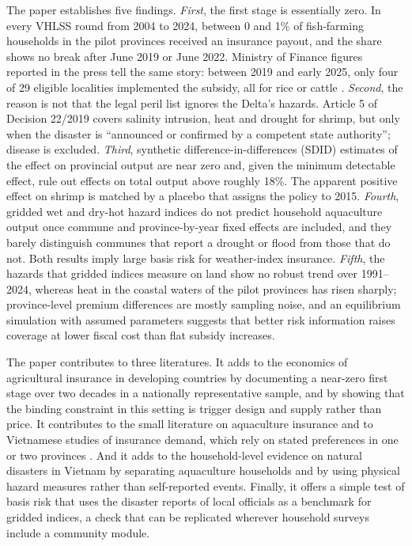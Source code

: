 \documentclass[11pt,a4paper]{article}
\begin{document}
The paper establishes five findings. \textit{First}, the first stage is essentially zero. In every VHLSS round from 2004 to 2024, between 0 and 1\% of fish-farming households in the pilot provinces received an insurance payout, and the share shows no break after June 2019 or June 2022. Ministry of Finance figures reported in the press tell the same story: between 2019 and early 2025, only four of 29 eligible localities implemented the subsidy, all for rice or cattle \parencite{tbtc2025nd58}. \textit{Second}, the reason is not that the legal peril list ignores the Delta's hazards. Article 5 of Decision 22/2019 covers salinity intrusion, heat and drought for shrimp, but only when the disaster is ``announced or confirmed by a competent state authority''; disease is excluded. \textit{Third}, synthetic difference-in-differences (SDID) estimates of the effect on provincial output are near zero and, given the minimum detectable effect, rule out effects on total output above roughly 18\%. The apparent positive effect on shrimp is matched by a placebo that assigns the policy to 2015. \textit{Fourth}, gridded wet and dry-hot hazard indices do not predict household aquaculture output once commune and province-by-year fixed effects are included, and they barely distinguish communes that report a drought or flood from those that do not. Both results imply large basis risk for weather-index insurance. \textit{Fifth}, the hazards that gridded indices measure on land show no robust trend over 1991--2024, whereas heat in the coastal waters of the pilot provinces has risen sharply; province-level premium differences are mostly sampling noise, and an equilibrium simulation with assumed parameters suggests that better risk information raises coverage at lower fiscal cost than flat subsidy increases.

The paper contributes to three literatures. It adds to the economics of agricultural insurance in developing countries \parencite{hazell1992,just1999,carter2017,jensen2016} by documenting a near-zero first stage over two decades in a nationally representative sample, and by showing that the binding constraint in this setting is trigger design and supply rather than price. It contributes to the small literature on aquaculture insurance \parencite{vananrooy2006,secretan2007,hobday2025} and to Vietnamese studies of insurance demand, which rely on stated preferences in one or two provinces \parencite{khoi2014tom,nghi2016tom,nguyenkat2021,tu2025}. And it adds to the household-level evidence on natural disasters in Vietnam \parencite{thomas2010,bui2014,arouri2015,hoang2024} by separating aquaculture households and by using physical hazard measures rather than self-reported events. Finally, it offers a simple test of basis risk that uses the disaster reports of local officials as a benchmark for gridded indices, a check that can be replicated wherever household surveys include a community module.
\end{document}
